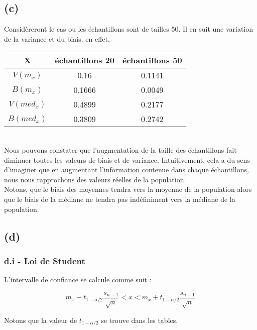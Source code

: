 \documentclass[10pt,a4paper]{article}
\begin{document}
\subsection*{(c)}

Considèreront le cas ou les échantillons sont de tailles 50. Il en suit une variation de la variance et du biais. en effet,\\

\begin{center}
\begin{tabular}{|c|c|c|}
\hline
X & échantillons 20 & échantillons 50 \\
\hline
\hline
$V(m_x)$ & 0.16 & 0.1141 \\ 
\hline
$B(m_x)$ & 0.1666 & 0.0049 \\
\hline
$V(med_x)$ & 0.4899 & 0.2177 \\
\hline
$B(med_x)$ & 0.3809 & 0.2742\\
\hline

\end{tabular}
\end{center}

\ \\

Nous pouvons constater que l'augmentation de la taille des échantillons fait diminuer toutes les valeurs de biais et de variance. Intuitivement, cela a du sens d'imaginer que en augmentant l'information contenue dans chaque échantillons, nous nous rapprochons des valeurs réelles de la population.\\

Notons, que le biais des moyennes tendra vers la moyenne de la population alors que le biais de la médiane ne tendra pas indéfiniment vers la médiane de la population. \\


\subsection*{(d)}



\subsubsection*{d.i - Loi de Student}
L'intervalle de confiance se calcule comme suit : 
\begin{center}

\[  m_x - t_{1-\alpha/2}\frac{s_{n-1}}{\sqrt{n}} < x < m_x + t_{1-\alpha/2}\frac{s_{n-1}}{\sqrt{n}} \]
\end{center}
Notons que la valeur de $t_{1 - \alpha / 2} $ se trouve dans les tables. 
\end{document}

